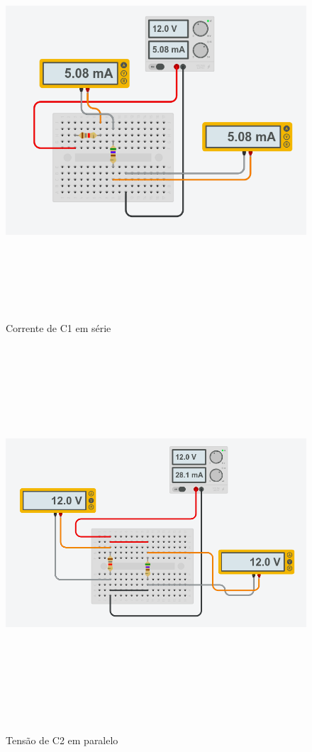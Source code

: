 \documentclass[
		12pt, %
		oneside, %
		a4paper, %
		article, %
		chapter=TITLE, %
		section=TITLE, %
		subsection=TITLE, %
		english, %
		spanish, %
		brazil %
]{abntex2} %
\numberwithin{equation}{section}
\numberwithin{figure}{section}
\numberwithin{table}{section}
\begin{document}
	\begin{figure}[h]
		\graphicspath{ {./esquematicos/} }

		\caption{Corrente de C1 em série}
		\includegraphics[width=15cm, height=14cm]{C1_S-C.png}
		\label{fig:figura2}

	\end{figure}
	\begin{figure}[h]
		\graphicspath{ {./esquematicos/} }

		\caption{Tensão de C2 em paralelo}
		\includegraphics[width=15cm, height=14cm]{C2_P-T.png}
		\label{fig:figura3}

	\end{figure}
\end{document}
